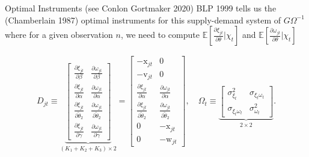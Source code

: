\begin{frame}{Optimal Instruments (see Conlon Gortmaker 2020)}
\noindent BLP 1999 tells us the (Chamberlain 1987) optimal instruments for this supply-demand system of $G\Omega^{-1}$ where for a given observation $n$, we need to compute $\mathbb{E}[\frac{\partial \xi_{jt}}{\partial \theta} | \chi_t]$ and $\mathbb{E}[\frac{\partial \omega_{jt}}{\partial \theta} | \chi_t]$

\begin{align*}
    D_{jt} \equiv \underbrace{
        \begin{bmatrix}
            \frac{\partial \xi_{jt}}{\partial \beta}
            & \frac{\partial \omega_{jt}}{\partial \beta} \\
            \frac{\partial \xi_{jt}}{\partial \alpha}
            & \frac{\partial \omega_{jt}}{\partial \alpha} \\
            \frac{\partial \xi_{jt}}{\partial \widetilde{\theta}_2}
            & \frac{\partial \omega_{jt}}{\partial \widetilde{\theta}_2} \\
            \frac{\partial \xi_{jt}}{\partial \gamma} 
            & \frac{\partial \omega_{jt}}{\partial \gamma} 
        \end{bmatrix}
    }_{(K_1 + K_2 + K_3)\times 2}
    = 
    \begin{bmatrix}
        -\mathrm{x}_{jt} & 0 \\
        -\mathrm{v}_{jt} & 0 \\
        \frac{\partial \xi_{jt}}{\partial \alpha}  
        &  \frac{\partial \omega_{jt}}{\partial \alpha}\\
        \frac{\partial \xi_{jt}}{\partial \widetilde{\theta}_2} 
        & \frac{\partial \omega_{jt}}{\partial \widetilde{\theta}_2} \\
        0 & -\mathrm{x}_{jt} \\
        0 & -\mathrm{w}_{jt}
    \end{bmatrix}
    , \quad \Omega_t \equiv 
    \underbrace{
        \begin{bmatrix}
        \sigma^2_{\xi_t} & \sigma_{\xi_t \omega_t}\\
        \sigma_{\xi_t \omega_t} & \sigma^2_{\omega_t}
    \end{bmatrix}
    }_{2 \times 2}.
\end{align*}
\end{frame}


